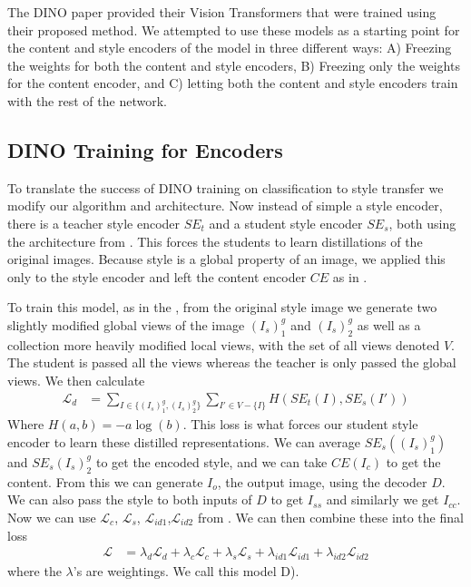 \documentclass{article}
\begin{document}
The DINO paper provided their Vision Transformers that were trained using their proposed method. We attempted to use these models as a starting point for the content and style encoders of the model in three different ways: A) Freezing the weights for both the content and style encoders, B) Freezing only the weights for the content encoder, and C) letting both the content and style encoders train with the rest of the network.

\subsection{DINO Training for Encoders}

To translate the success of DINO training on classification to style transfer we modify our algorithm and architecture. Now instead of simple a style encoder, there is a teacher style encoder $SE_t$ and a student style encoder $SE_s$, both using the architecture from \cite{ImageStyleTransformer}. This forces the students to learn distillations of the original images. Because style is a global property of an image, we applied this only to the style encoder and left the content encoder $CE$ as in \cite{ImageStyleTransformer}. 

To train this model, as in the \cite{DINO}, from the original style image we generate two slightly modified global views of the image $(I_s)^g_1$ and $(I_s)^g_2$ as well as a collection more heavily modified local views, with the set of all views denoted $V$. The student is passed all the views whereas the teacher is only passed the global views. We then calculate 
\begin{align}
	\mathcal L_d &= \sum_{I \in \{(I_s)^g_1, (I_s)^g_2\}} \sum_{I' \in V - \{ I \}} H(SE_t(I), SE_s(I'))
\end{align} 
Where $H(a,b) = -a \log (b)$. This loss is what forces our student style encoder to learn these distilled representations. We can average $SE_s((I_s)^g_1)$ and $SE_s(I_s)^g_2$ to get the encoded style, and we can take $CE(I_c)$ to get the content. From this we can generate $I_o$, the output image, using the decoder $D$. We can also pass the style to both inputs of $D$ to get $I_{ss}$ and similarly we get $I_{cc}$. Now we can use $\mathcal L_c$, $\mathcal L_s$, $\mathcal L_{id1}$,$\mathcal L_{id2}$ from \cite{ImageStyleTransformer}. We can then combine these into the final loss
\begin{align}
	\mathcal L &= \lambda_d \mathcal L_d + \lambda_c \mathcal L_c + \lambda_s \mathcal L_s + \lambda_{id1} \mathcal L_{id1} + \lambda_{id2} \mathcal L_{id2}
\end{align}
where the $\lambda$'s are weightings. We call this model D). 
\end{document}
